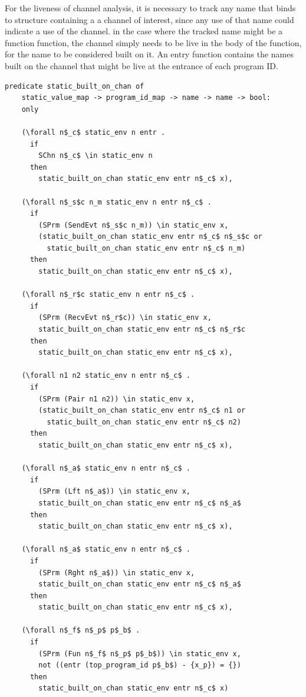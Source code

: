 \documentclass[10pt]{article}
\begin{document}
For the liveness of channel analysis, it is necessary to track any name that binds to structure
containing a a channel of interest, since any use of that name could indicate a use of the
channel. in the case where the tracked name might be a function function, the channel simply
needs to be live in the body of the function, for the name to be considered built on it.
An entry function contains the names built on the channel that might be live at the entrance
of each program ID.

\begin{lstlisting}[language=logic, mathescape]
  predicate static_built_on_chan of
    static_value_map -> program_id_map -> name -> name -> bool:
    only

    (\forall n$_c$ static_env n entr .
      if 
        SChn n$_c$ \in static_env n 
      then 
        static_built_on_chan static_env entr n$_c$ x),

    (\forall n$_s$c n_m static_env n entr n$_c$ . 
      if
        (SPrm (SendEvt n$_s$c n_m)) \in static_env x,
        (static_built_on_chan static_env entr n$_c$ n$_s$c or
          static_built_on_chan static_env entr n$_c$ n_m)
      then 
        static_built_on_chan static_env entr n$_c$ x),

    (\forall n$_r$c static_env n entr n$_c$ . 
      if  
        (SPrm (RecvEvt n$_r$c)) \in static_env x,
        static_built_on_chan static_env entr n$_c$ n$_r$c
      then 
        static_built_on_chan static_env entr n$_c$ x),

    (\forall n1 n2 static_env n entr n$_c$ . 
      if  
        (SPrm (Pair n1 n2)) \in static_env x,
        (static_built_on_chan static_env entr n$_c$ n1 or
          static_built_on_chan static_env entr n$_c$ n2)
      then 
        static_built_on_chan static_env entr n$_c$ x),

    (\forall n$_a$ static_env n entr n$_c$ .
      if
        (SPrm (Lft n$_a$)) \in static_env x,
        static_built_on_chan static_env entr n$_c$ n$_a$
      then 
        static_built_on_chan static_env entr n$_c$ x),

    (\forall n$_a$ static_env n entr n$_c$ .
      if
        (SPrm (Rght n$_a$)) \in static_env x,
        static_built_on_chan static_env entr n$_c$ n$_a$
      then 
        static_built_on_chan static_env entr n$_c$ x),

    (\forall n$_f$ n$_p$ p$_b$ .
      if
        (SPrm (Fun n$_f$ n$_p$ p$_b$)) \in static_env x,
        not ((entr (top_program_id p$_b$) - {x_p}) = {})
      then
        static_built_on_chan static_env entr n$_c$ x)
  \end{lstlisting}
\end{document}
